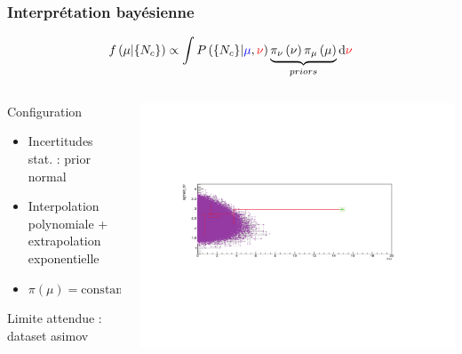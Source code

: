 \begin{frame}
\frametitle{Interpr\'etation bayésienne}

\vspace*{-.2cm}
\begin{small}
\[f\left(\mu|\{N_{c}\}\right)\propto \displaystyle\int P\left(\{N_{c}\}|\textcolor{blue}{\mu},\textcolor{red}{\nu}\right)\underbrace{\pi_\nu\left(\nu\right)\pi_\mu\left(\mu\right)}_{priors}{\rm d}\textcolor{red}{\nu}\]

\vspace*{-2.4cm}

\begin{columns}
\begin{column}{0.6\textwidth}
\begin{footnotesize}
\begin{maliste}
\item Configuration
\begin{itemize}
\item Incertitudes stat. : prior normal
\item Interpolation polynomiale + extrapolation exponentielle
\item $\pi(\mu)=\text{constant}$
\end{itemize}
\vspace*{0.1cm}
\item Limite attendue : dataset asimov
\end{maliste}
\end{footnotesize}
\end{column}
\begin{column}{0.5\textwidth}
\hspace*{-2.1cm}
\includegraphics[width=1.75\linewidth]{Figures/FourTops/markovchainexample.pdf}
\end{column}
\end{columns}
\end{small}


\end{frame}
